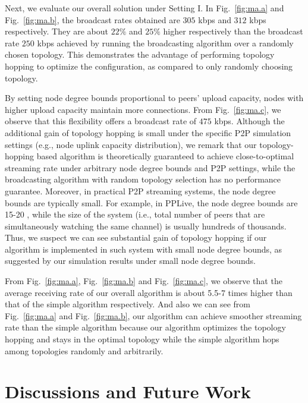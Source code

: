 \documentclass[10pt,conference]{IEEEtran}
\begin{document}
Next, we evaluate our overall solution under Setting I. In Fig.~\ref{fig:ma.a} and Fig.~\ref{fig:ma.b}, the broadcast rates obtained are $305$ kbps and $312$ kbps respectively. They are about $22\%$ and $25\%$ higher respectively than the broadcast rate $250$ kbps achieved by running the broadcasting algorithm over a randomly chosen topology. This demonstrates the advantage of performing topology hopping to optimize the configuration, as compared to only randomly choosing topology.

By setting node degree bounds proportional to peers' upload capacity, nodes with higher upload capacity maintain more connections. From Fig.~\ref{fig:ma.c}, we observe that this flexibility offers a broadcast rate of $475$ kbps. Although the additional gain of topology hopping is small under the specific P2P simulation settings (e.g., node uplink capacity distribution), we remark that our topology-hopping based algorithm is theoretically guaranteed to achieve close-to-optimal streaming rate under arbitrary node degree bounds and P2P settings, while the broadcasting algorithm with random topology selection has no performance guarantee. Moreover, in practical P2P streaming systems, the node degree bounds are typically small. For example, in PPLive, the node degree bounds are 15-20 \cite{streaming_capacity.allerton09}, while the size of the system (i.e., total number of peers that are simultaneously watching the same channel) is usually hundreds of thousands. Thus, we suspect we can see substantial gain of topology hopping if our algorithm is implemented in such system with small node degree bounds, as suggested by our simulation results under small node degree bounds.

From Fig.~\ref{fig:ma.a}, Fig.~\ref{fig:ma.b} and Fig.~\ref{fig:ma.c}, we observe that the average receiving rate of our overall algorithm is about 5.5-7 times higher than that of the simple algorithm respectively. And also we can see from Fig.~\ref{fig:ma.a} and Fig.~\ref{fig:ma.b}, our algorithm can achieve smoother streaming rate than the simple algorithm because our algorithm optimizes the topology hopping and stays in the optimal topology while the simple algorithm hops among topologies randomly and arbitrarily.

\section{Discussions and Future Work}

\label{sec:conclusion}
\end{document}
